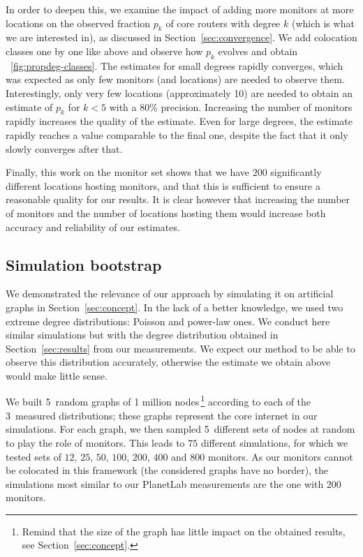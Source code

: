 \documentclass[conference]{IEEEtran}
\begin{document}

In order to deepen this, we examine the impact of adding more monitors at more locations on the observed fraction $p_k$ of core routers with degree $k$ (which is what we are interested in), as discussed in Section~\ref{sec:convergence}. We add colocation classes one by one like above and observe how $p_k$ evolves and obtain \figurename~\ref{fig:propdeg-classes}. The estimates for small degrees rapidly converges, which was expected as only few monitors (and locations) are needed to observe them. Interestingly, only very few locations (approximately 10) are needed to obtain an estimate of $p_k$ for $k<5$ with a 80\% precision. Increasing the number of monitors rapidly increases the quality of the estimate. Even for large degrees, the estimate rapidly reaches a value comparable to the final one, despite the fact that it only slowly converges after that.

Finally, this work on the monitor set shows that we have $200$ significantly different locations hosting monitors, and that this is sufficient to ensure a reasonable quality for our results. It is clear however that increasing the number of monitors and the number of locations hosting them would increase both accuracy and reliability of our estimates.

\subsection{Simulation bootstrap}

We demonstrated the relevance of our approach by simulating it on artificial graphs in Section~\ref{sec:concept}. In the lack of a better knowledge, we used two extreme degree distributions: Poisson and power-law ones. We conduct here similar simulations but with the degree distribution obtained in Section~\ref{sec:results} from our measurements. We expect our method to be able to observe this distribution accurately, otherwise the estimate we obtain above would make little sense.

We built 5~random graphs of 1 million nodes\,\footnote{Remind that the size of the graph has little impact on the obtained results, see Section~\ref{sec:concept}.} according to each of the 3~measured distributions; these graphs represent the core internet in our simulations. For each graph, we then sampled 5~different sets of nodes at random to play the role of monitors. This leads to $75$ different simulations, for which we tested sets of $12$, $25$, $50$, $100$, $200$, $400$ and $800$ monitors. As our monitors cannot be colocated in this framework (the considered graphs have no border), the simulations most similar to our PlanetLab measurements are the one with $200$ monitors.
\end{document}
